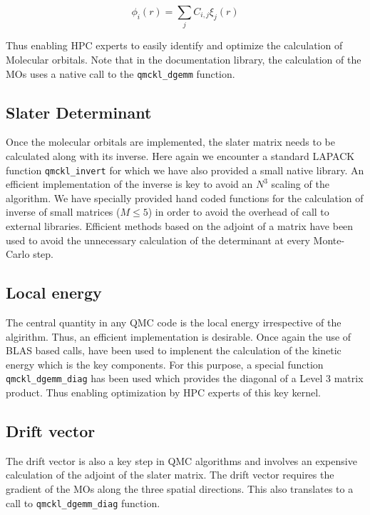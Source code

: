 \begin{equation}
  \phi_i(r) = \sum_{j}C_{i,j}\xi_j(r)
\end{equation}

Thus enabling HPC experts to easily identify and optimize the calculation
of Molecular orbitals. Note that in the documentation library, the
calculation of the MOs uses a native call to the \texttt{qmckl_dgemm}
function.

\subsection{Slater Determinant}

Once the molecular orbitals are implemented, the slater matrix needs to be
calculated along with its inverse. Here again we encounter a standard
\ac{LAPACK} function \texttt{qmckl_invert} for which we have also
provided a small native library. An efficient implementation of the inverse is
key to avoid an $N^3$ scaling of the algorithm. We have specially provided hand
coded functions for the calculation of inverse of small matrices ($M\le 5$) in
order to avoid the overhead of call to external libraries. Efficient methods
based on the adjoint of a matrix \cite{MCMQC} have been used to avoid the
unnecessary calculation of the determinant at every Monte-Carlo step.

\subsection{Local energy}

The central quantity in any QMC code is the local energy irrespective of
the algirithm. Thus, an efficient implementation is desirable. Once again
the use of \ac{BLAS} based calls, have been used to implenent the calculation
of the kinetic energy which is the key components. For this purpose, a
special function \texttt{qmckl_dgemm_diag} has been used which
provides the diagonal of a Level 3 matrix product. Thus enabling optimization
by HPC experts of this key kernel.

\subsection{Drift vector}

The drift vector is also a key step in \ac{QMC} algorithms and
involves an expensive calculation of the adjoint of the slater matrix.
The drift vector requires the gradient of the MOs along the three
spatial directions. This also translates to a call to \texttt{qmckl_dgemm_diag} function.

